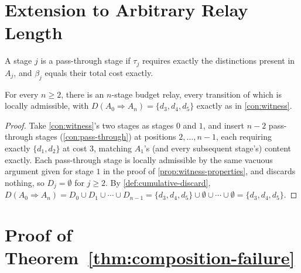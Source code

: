 \section{Extension to Arbitrary Relay Length}

\begin{construction}
\label{con:pass-through}
A stage $j$ is a pass-through stage if $\tau_j$ requires exactly the
distinctions present in $A_j$, and $\beta_j$ equals their total cost
exactly.
\end{construction}

\begin{proposition}
\label{prop:extension}
For every $n \ge 2$, there is an $n$-stage budget relay, every transition
of which is locally admissible, with $D(A_0 \Rightarrow A_n) =
\{d_3,d_4,d_5\}$ exactly as in \cref{con:witness}.
\end{proposition}

\begin{proof}
Take \cref{con:witness}'s two stages as stages $0$ and $1$, and insert
$n-2$ pass-through stages (\cref{con:pass-through}) at positions $2,
\ldots, n-1$, each requiring exactly $\{d_1,d_2\}$ at cost $3$, matching
$A_1$'s (and every subsequent stage's) content exactly. Each pass-through
stage is locally admissible by the same vacuous argument given for stage
$1$ in the proof of \cref{prop:witness-properties}, and discards nothing,
so $D_j = \emptyset$ for $j \ge 2$. By \cref{def:cumulative-discard},
$D(A_0 \Rightarrow A_n) = D_0 \cup D_1 \cup \cdots \cup D_{n-1} =
\{d_3,d_4,d_5\} \cup \emptyset \cup \cdots \cup \emptyset =
\{d_3,d_4,d_5\}$.
\end{proof}

\section{Proof of Theorem~\ref{thm:composition-failure}}

